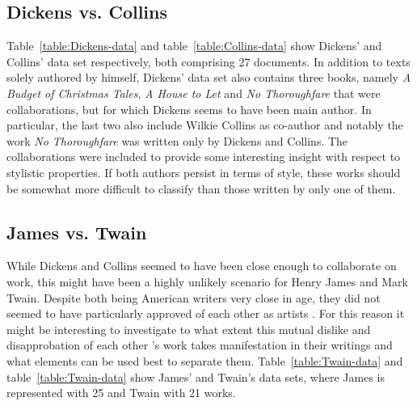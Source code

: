 \documentclass[a4paper,10pt,twoside,fleqn]{article}
\begin{document}
\subsection{Dickens vs. Collins}
Table~\ref{table:Dickens-data} and table~\ref{table:Collins-data} show Dickens'
and Collins' data set respectively, both comprising 27 documents.
In addition to texts solely authored by himself, Dickens' data set also contains
three books, namely \emph{A Budget of Christmas Tales}, \emph{A House to Let} and \emph{No Thoroughfare}
that were collaborations, but for which Dickens seems to have been main author.
In particular, the last two also include Wilkie Collins as co-author and notably the work
\emph{No Thoroughfare} was written only by Dickens and Collins.
The collaborations were included to provide some interesting insight with respect to stylistic properties.
If both authors persist in terms of style, these works should be somewhat more difficult
to classify than those written by only one of them.


\subsection{James vs. Twain}
While Dickens and Collins seemed to have been close enough to collaborate on work,
this might have been a highly unlikely scenario for Henry James and Mark Twain.
Despite both being American writers very close in age, they did not seemed to have
particularly approved of each other as artists \cite{canby1951turn}.
For this reason it might be interesting to investigate to what extent this mutual dislike and
disapprobation of each other 's work takes manifestation in their writings
and what elements can be used best to separate them.
Table~\ref{table:Twain-data} and table~\ref{table:Twain-data} show
James' and Twain's data sets, where James is represented with 25 and Twain
with 21 works.
\end{document}
